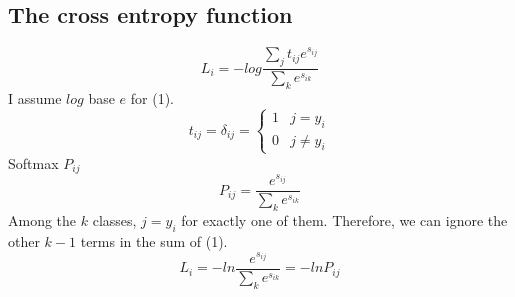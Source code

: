 \documentclass[12pt, letter]{article}
\begin{document}
{\subsection{The cross entropy function}
\begin{equation}
  L_i = - log \frac{\sum_jt_{ij}e^{s_{ij}}}{\sum_ke^{s_{ik}}}
\end{equation}
I assume $log$ base $e$ for (1).
\begin{equation}
  t_{ij} = \delta_{ij} =
  \begin{cases}
    1 & j = y_i \\
    0 & j \ne y_i
  \end{cases}
\end{equation}
Softmax $P_{ij}$
\begin{equation}
  P_{ij} = \frac{e^{s_{ij}}}{\sum_{k}e^{s_{ik}}}
\end{equation}
Among the $k$ classes, $j = y_{i}$ for exactly one of them. Therefore, we can
ignore the other $k-1$ terms in the sum of (1).
\begin{equation}
  L_i = - ln \frac{e^{s_{ij}}}{\sum_k{e^{s_{ik}}}} = -ln P_{ij}
\end{equation}
}
\end{document}
